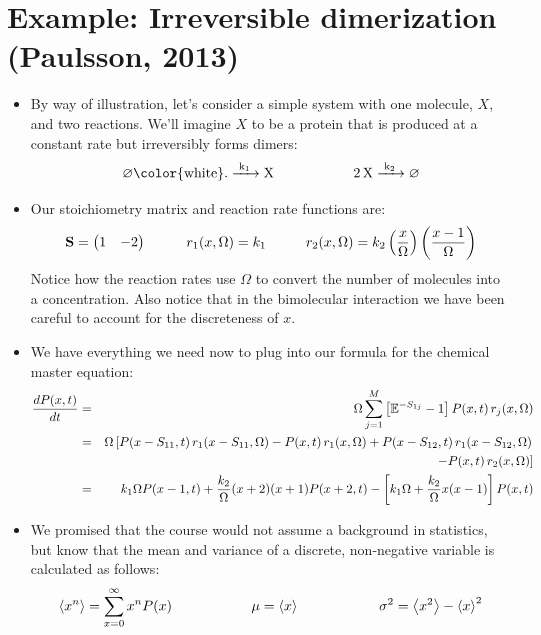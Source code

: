 \documentclass{article}
\begin{document}
\section*{Example: Irreversible dimerization (Paulsson, 2013)}
\begin{itemize}
\item By way of illustration, let's consider a simple system with one molecule, $X$, and two reactions. We'll imagine $X$ to be a protein that is produced at a constant rate but irreversibly forms dimers:
\[ \ce{\varnothing {\color{white}.} ->[k_1] X} \hspace{2 cm} \ce{2X ->[k_2] \varnothing} \]
\item Our stoichiometry matrix and reaction rate functions are:
\[ \mathbf{S} = \begin{pmatrix} 1 & -2 \end{pmatrix} \hspace{1 cm} r_1(x,\Omega) = k_1  \hspace{1 cm} r_2(x,\Omega) = k_2 \left( \frac{x}{\Omega} \right) \left( \frac{x - 1}{\Omega} \right) \]
Notice how the reaction rates use $\Omega$ to convert the number of molecules into a concentration. Also notice that in the bimolecular interaction we have been careful to account for the discreteness of $x$.
\item We have everything we need now to plug into our formula for the chemical master equation:
\begin{eqnarray*}
\frac{dP(x,t)}{dt} & = & \Omega \sum_{j=1}^M \left[ \mathbb{E}^{-S_{1j}} - 1 \right]  P(x,t) \, r_j (x, \Omega)\\
& = & \Omega \left[ P(x-S_{11},t) \, r_1(x-S_{11},\Omega) - P(x,t) \, r_1(x,\Omega) + P(x-S_{12},t) \, r_1(x-S_{12},\Omega) \right.\\
& & \hspace{1 cm} \left. - P(x,t) \, r_2(x,\Omega) \right]\\
& = & k_1 \Omega P(x-1,t) + \frac{k_2}{\Omega}(x+2)(x+1) P(x+2,t) - \left[ k_1 \Omega + \frac{k_2}{\Omega} x(x-1) \right] P(x,t)
\end{eqnarray*}
\item We promised that the course would not assume a background in statistics, but know that the mean and variance of a discrete, non-negative variable is calculated as follows:
\[ \left< x^n \right> = \sum_{x=0}^{\infty} x^n P(x) \hspace{2 cm} \mu = \left< x \right> \hspace{ 2 cm} \sigma^2 = \left< x^2 \right> - \left< x \right>^2 \]

\end{itemize}
\end{document}
